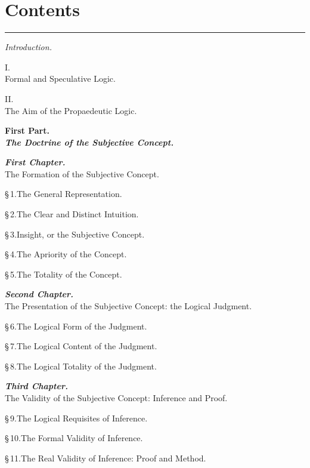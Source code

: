 \documentclass[12pt]{book}
\begin{document}
\chapter*{Contents}
\begin{center}\rule{0.35\linewidth}{0.4pt}\end{center}
{\small\setlength{\parindent}{0pt}\setlength{\parskip}{2pt}

\begin{center}\emph{Introduction.}\end{center}
\begin{center}I.\\ Formal and Speculative Logic.\end{center}
\begin{center}II.\\ The Aim of the Propaedeutic Logic.\end{center}

\begin{center}{\bfseries First Part.}\\ {\bfseries\emph{The Doctrine of the Subjective Concept.}}\end{center}

\begin{center}{\bfseries\emph{First Chapter.}}\\ The Formation of the Subjective Concept.\end{center}
\S\,1.\quad The General Representation.\par
\S\,2.\quad The Clear and Distinct Intuition.\par
\S\,3.\quad Insight, or the Subjective Concept.\par
\S\,4.\quad The Apriority of the Concept.\par
\S\,5.\quad The Totality of the Concept.\par

\begin{center}{\bfseries\emph{Second Chapter.}}\\ The Presentation of the Subjective Concept: the Logical Judgment.\end{center}
\S\,6.\quad The Logical Form of the Judgment.\par
\S\,7.\quad The Logical Content of the Judgment.\par
\S\,8.\quad The Logical Totality of the Judgment.\par

\begin{center}{\bfseries\emph{Third Chapter.}}\\ The Validity of the Subjective Concept: Inference and Proof.\end{center}
\S\,9.\quad The Logical Requisites of Inference.\par
\S\,10.\quad The Formal Validity of Inference.\par
\S\,11.\quad The Real Validity of Inference: Proof and Method.\par

}
\end{document}
